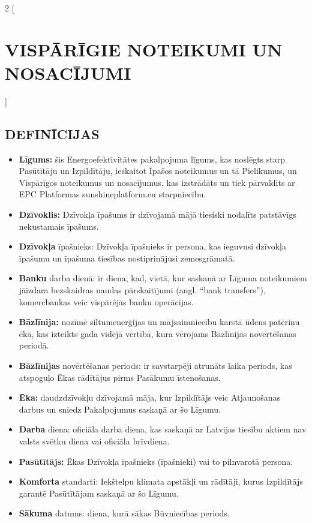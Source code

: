 \begin{multicols}{2}
[\section{VISPĀRĪGIE NOTEIKUMI UN NOSACĪJUMI}]

\subsection{DEFINĪCIJAS}
\begin{itemize}[label={}]
	\item\textbf{Līgums:} šis Energoefektivitātes pakalpojuma līgums, kas noslēgts starp Pasūtītāju un Izpildītāju, ieskaitot Īpašos noteikumus un tā Pielikumus, un Vispārīgos noteikumus un nosacījumus, kas izstrādāts un tiek pārvaldīts ar EPC Platformas sunshineplatform.eu starpniecību.
	\item\textbf{Dzīvoklis:} Dzīvokļa īpašums ir dzīvojamā mājā tiesiski nodalīts patstāvīgs nekustamais īpašums.
	\item\textbf{Dzīvokļa} īpašnieks: Dzīvokļa īpašnieks ir persona, kas ieguvusi dzīvokļa īpašumu un īpašuma tiesības nostiprinājusi zemesgrāmatā.
	\item\textbf{Banku} darba dienā: ir diena, kad, vietā, kur saskaņā ar Līguma noteikumiem jāizdara bezskaidras naudas pārskaitījumi (angl. “bank transfers”), komercbankas veic vispārējās banku operācijas.
	\item\textbf{Bāzlīnija:} nozīmē siltumenerģijas un mājsaimniecību karstā ūdens patēriņu ēkā, kas izteikts gada vidējā vērtībā, kura vērojams Bāzlīnijas novērtēšanas periodā.
	\item\textbf{Bāzlīnijas} novērtēšanas periods: ir savstarpēji atrunāts laika periods, kas atspoguļo Ēkas rādītājus pirms Pasākumu īstenošanas.
	\item\textbf{Ēka:} daudzdzīvokļu dzīvojamā māja, kur Izpildītājs veic Atjaunošanas darbus un sniedz Pakalpojumus saskaņā ar šo Līgumu.
	\item\textbf{Darba} diena:  oficiāla darba diena, kas saskaņā ar Latvijas tiesību aktiem nav valsts svētku diena vai oficiāla brīvdiena.
	\item\textbf{Pasūtītājs:} Ēkas Dzīvokļa īpašnieks (īpašnieki) vai to pilnvarotā persona.
	\item\textbf{Komforta} standarti: Iekštelpu klimata apstākļi un rādītāji, kurus Izpildītājs garantē Pasūtītājam saskaņā ar šo Līgumu.
	\item\textbf{Sākuma} datums: diena, kurā sākas Būvniecības periods.

\end{itemize}
\end{multicols}
